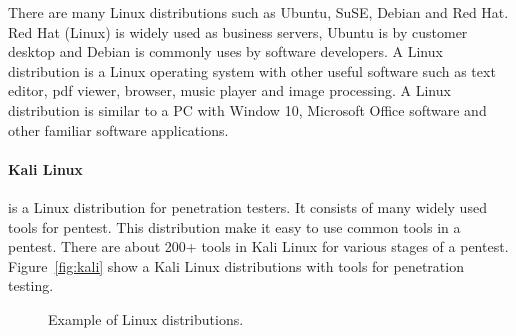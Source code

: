 \documentclass[7x9]{times}
\begin{document}
There are many Linux distributions such as Ubuntu, SuSE,
Debian and Red Hat. Red Hat (Linux) is widely used as
business servers, Ubuntu is by customer desktop and Debian
is commonly uses by software developers. A Linux
distribution is a Linux operating system with other useful
software such as text editor, pdf viewer, browser, music
player and image processing. A Linux distribution is similar
to a PC with Window 10, Microsoft Office software and other
familiar software applications. 


\paragraph{Kali Linux}is a Linux distribution for
penetration testers. It consists of many widely used tools
for pentest. This distribution make it easy to use common
tools in a pentest. There are about 200+ tools in Kali Linux
for various stages of a pentest. Figure~\ref{fig:kali} show
a Kali Linux distributions with tools for penetration
testing.


\begin{figure}[!t]
\centering
{}
\hfil
{}
\caption{Example of Linux distributions.}
\label{fig:linux}
\end{figure}
\end{document}
